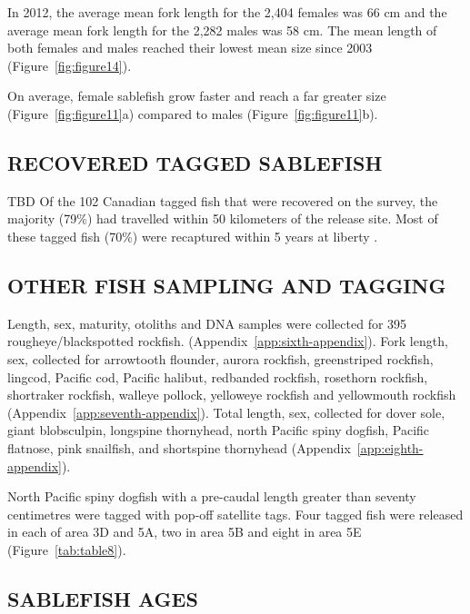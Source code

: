 \documentclass[12pt]{article}\usepackage[]{graphicx}\usepackage[]{color}
\begin{document}
In 2012, the average mean fork length for the 2,404 females was 66 cm and the average mean fork length for the 2,282 males was 58 cm. The mean length of both females and males reached their lowest mean size since 2003 (Figure~\ref{fig:figure14}).

On average, female sablefish grow faster and reach a far greater size (Figure~\ref{fig:figure11}a) compared to males (Figure~\ref{fig:figure11}b).

\hypertarget{recovered-tagged-sablefish}{%
\subsection{RECOVERED TAGGED SABLEFISH}\label{recovered-tagged-sablefish}}

TBD Of the 102 Canadian tagged fish that were recovered on the survey, the majority (79\%) had travelled within 50 kilometers of the release site. Most of these tagged fish (70\%) were recaptured within 5 years at liberty .

\hypertarget{other-fish-sampling-and-tagging}{%
\subsection{OTHER FISH SAMPLING AND TAGGING}\label{other-fish-sampling-and-tagging}}

Length, sex, maturity, otoliths and DNA samples were collected for 395 rougheye/blackspotted rockfish. (Appendix~\ref{app:sixth-appendix}). Fork length, sex, collected for arrowtooth flounder, aurora rockfish, greenstriped rockfish, lingcod, Pacific cod, Pacific halibut, redbanded rockfish, rosethorn rockfish, shortraker rockfish, walleye pollock, yelloweye rockfish and yellowmouth rockfish (Appendix~\ref{app:seventh-appendix}). Total length, sex, collected for dover sole, giant blobsculpin, longspine thornyhead, north Pacific spiny dogfish, Pacific flatnose, pink snailfish, and shortspine thornyhead (Appendix~\ref{app:eighth-appendix}).

North Pacific spiny dogfish with a pre-caudal length greater than seventy centimetres were tagged with pop-off satellite tags. Four tagged fish were released in each of area 3D and 5A, two in area 5B and eight in area 5E (Figure~\ref{tab:table8}).

\hypertarget{sablefish-ages}{%
\subsection{SABLEFISH AGES}\label{sablefish-ages}}
\end{document}
